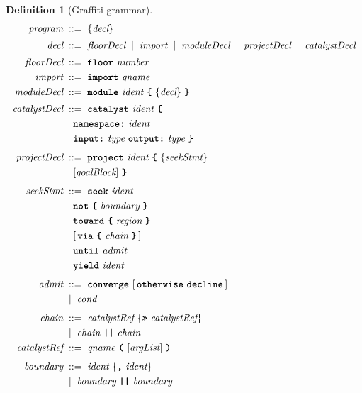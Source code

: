 \documentclass[11pt,twocolumn,a4paper]{article}
\theoremstyle{thmstyle}
\theoremstyle{definition}
\newtheorem{definition}[theorem]{Definition}
\theoremstyle{remark}
\newcommand{\bnfeq}{\;::=\;}
\newcommand{\bnfor}{\;\mid\;}
\newcommand{\tm}[1]{\textbf{\texttt{#1}}}
\begin{document}
\begin{definition}[Graffiti grammar]
\label{def:grammar}
\begin{align*}
\textit{program} &\bnfeq \{\textit{decl}\} \\[2pt]
\textit{decl} &\bnfeq \textit{floorDecl} \bnfor \textit{import}
   \bnfor \textit{moduleDecl} \bnfor \textit{projectDecl}
   \bnfor \textit{catalystDecl}\\[2pt]
\textit{floorDecl} &\bnfeq \tm{floor}\ \textit{number} \\
\textit{import} &\bnfeq \tm{import}\ \textit{qname} \\
\textit{moduleDecl} &\bnfeq \tm{module}\ \textit{ident}\ \tm{\{}\
   \{\textit{decl}\}\ \tm{\}} \\[2pt]
\textit{catalystDecl} &\bnfeq \tm{catalyst}\ \textit{ident}\ \tm{\{}\\
   &\quad \tm{namespace}\tm{:}\ \textit{ident}\ \\
   &\quad \tm{input}\tm{:}\ \textit{type}\ \tm{output}\tm{:}\ \textit{type}\
   \tm{\}}\\[4pt]
\textit{projectDecl} &\bnfeq \tm{project}\ \textit{ident}\ \tm{\{}\
   \{\textit{seekStmt}\}\\
   &\quad [\textit{goalBlock}]\ \tm{\}} \\[4pt]
\textit{seekStmt} &\bnfeq \tm{seek}\ \textit{ident}\\
   &\quad \tm{not}\ \tm{\{}\ \textit{boundary}\ \tm{\}}\\
   &\quad \tm{toward}\ \tm{\{}\ \textit{region}\ \tm{\}}\\
   &\quad [\,\tm{via}\ \tm{\{}\ \textit{chain}\ \tm{\}}\,]\\
   &\quad \tm{until}\ \textit{admit}\\
   &\quad \tm{yield}\ \textit{ident} \\[4pt]
\textit{admit} &\bnfeq \tm{converge}\ [\,\tm{otherwise}\ \tm{decline}\,]\\
   &\bnfor \textit{cond} \\[4pt]
\textit{chain} &\bnfeq \textit{catalystRef}\ \{\tm{>>}\ \textit{catalystRef}\}\\
   &\bnfor \textit{chain}\ \tm{\textbar\textbar}\ \textit{chain} \\
\textit{catalystRef} &\bnfeq \textit{qname}\ \tm{(}\ [\textit{argList}]\ \tm{)} \\[4pt]
\textit{boundary} &\bnfeq \textit{ident}\ \{\tm{,}\ \textit{ident}\}\\
   &\bnfor \textit{boundary}\ \tm{\textbar\textbar}\ \textit{boundary}\\

\end{align*}
\end{definition}
\end{document}
